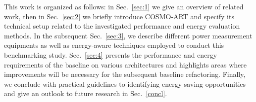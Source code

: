 This  work is  organized as  follows: in  Sec.~\ref{sec:1} we  give an
overview  of  related  work,   then  in  Sec.~\ref{sec:2}  we  briefly
introduce  COSMO-ART and specify  its technical  setup related  to the
investigated  performance  and  energy  evaluation  methods.   In  the
subsequent Sec.~\ref{sec:3},  we describe different  power measurement
equipments as well as energy-aware techniques employed to conduct this
benchmarking  study.  Sec.~\ref{sec:4}  presents  the performance  and
energy  requirements  of the  baseline  on  various architectures  and
highlights  areas  where  improvements   will  be  necessary  for  the
subsequent baseline refactoring.   Finally, we conclude with practical
guidelines  to identifying  energy  saving opportunities  and give  an
outlook to future research in Sec.~\ref{concl}.
